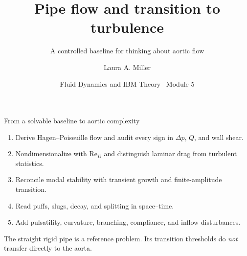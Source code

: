 \documentclass[aspectratio=169,11pt]{beamer}
\title[Pipe transition]{Pipe flow and transition to turbulence}
\subtitle{A controlled baseline for thinking about aortic flow}
\author[Miller]{Laura A. Miller}
\institute[UArizona]{Department of Mathematics, University of Arizona}
\date{Fluid Dynamics and IBM Theory \textbullet\ Module 5}
\newcommand{\Rey}{\mathrm{Re}}
\begin{document}
\begin{frame}[plain]
\end{frame}

\begin{frame}{From a solvable baseline to aortic complexity}
\begin{enumerate}\itemsep7pt
  \item Derive Hagen--Poiseuille flow and audit every sign in $\Delta p$, $Q$, and wall shear.
  \item Nondimensionalize with $\Rey_D$ and distinguish laminar drag from turbulent statistics.
  \item Reconcile modal stability with transient growth and finite-amplitude transition.
  \item Read puffs, slugs, decay, and splitting in space--time.
  \item Add pulsatility, curvature, branching, compliance, and inflow disturbances.
\end{enumerate}

\begin{punchbox}
\centering
The straight rigid pipe is a reference problem. Its transition thresholds do \emph{not} transfer directly to the aorta.
\end{punchbox}
\end{frame}
\end{document}
